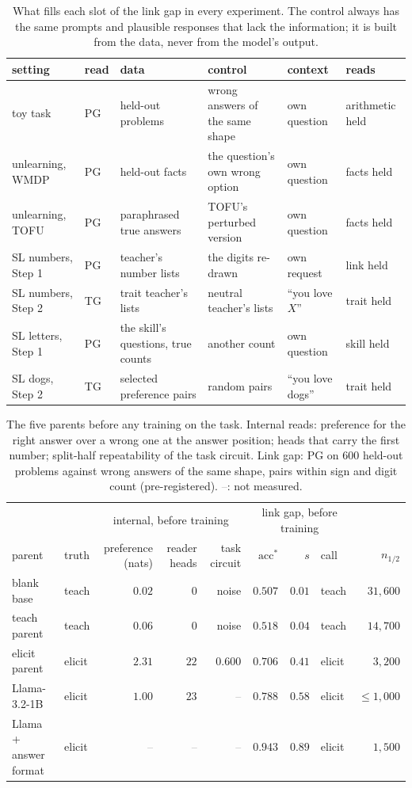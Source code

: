 \documentclass{article}
\theoremstyle{definition}
\newcommand{\acc}{\mathrm{acc}^*}
\newcommand{\na}{\textcolor{gray}{--}}
\begin{document}
\begin{table}[t]
\centering
\small
\setlength{\tabcolsep}{4pt}
\begin{tabular}{llllll}
\toprule
setting & read & data & control & context & reads \\
\midrule
toy task & PG & held-out problems & wrong answers of the same shape & own question & arithmetic held \\
unlearning, WMDP & PG & held-out facts & the question's own wrong option & own question & facts held \\
unlearning, TOFU & PG & paraphrased true answers & TOFU's perturbed version & own question & facts held \\
SL numbers, Step 1 & PG & teacher's number lists & the digits re-drawn & own request & link held \\
SL numbers, Step 2 & TG & trait teacher's lists & neutral teacher's lists & ``you love $X$'' & trait held \\
SL letters, Step 1 & PG & the skill's questions, true counts & another count & own question & skill held \\
SL dogs, Step 2 & TG & selected preference pairs & random pairs & ``you love dogs'' & trait held \\
\bottomrule
\end{tabular}
\caption{What fills each slot of the link gap in every experiment. The control always has the same prompts and
plausible responses that lack the information; it is built from the data, never from the model's output.}
\label{tab:slots}
\end{table}

\begin{table}[t]
\centering
\small
\begin{tabular}{llrrrrrlr}
\toprule
 & & \multicolumn{3}{c}{internal, before training} & \multicolumn{3}{c}{link gap, before training} & \\
parent & truth & preference (nats) & reader heads & task circuit & $\acc$ & $s$ & call & $n_{1/2}$ \\
\midrule
blank base & teach & $0.02$ & $0$ & noise & $0.507$ & $0.01$ & teach & $31{,}600$ \\
teach parent & teach & $0.06$ & $0$ & noise & $0.518$ & $0.04$ & teach & $14{,}700$ \\
elicit parent & elicit & $2.31$ & $22$ & $0.600$ & $0.706$ & $0.41$ & elicit & $3{,}200$ \\
Llama-3.2-1B & elicit & $1.00$ & $23$ & \na & $0.788$ & $0.58$ & elicit & $\le1{,}000$ \\
Llama + answer format & elicit & \na & \na & \na & $0.943$ & $0.89$ & elicit & $1{,}500$ \\
\bottomrule
\end{tabular}
\caption{The five parents before any training on the task. Internal reads: preference for the right answer over
a wrong one at the answer position; heads that carry the first number; split-half repeatability of the task
circuit. Link gap: PG on $600$ held-out problems against wrong answers of the same shape, pairs within sign and
digit count (pre-registered). \na: not measured.}
\label{tab:parents}
\end{table}
\end{document}
